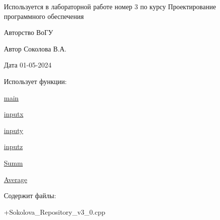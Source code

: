 Используется в лабораторной работе номер 3 по курсу Проектирование программного обеспечения \begin{DoxyCopyright}{Авторство}
ВоГУ 
\end{DoxyCopyright}
\begin{DoxyAuthor}{Автор}
Соколова В.\+А. 
\end{DoxyAuthor}
\begin{DoxyDate}{Дата}
01-\/05-\/2024 
\end{DoxyDate}
\begin{DoxyParagraph}{Использует функции\+:}

\begin{DoxyItemize}
\item \hyperlink{_09_sokolova___repository__v3__0_8cpp_ae66f6b31b5ad750f1fe042a706a4e3d4}{main}
\item \hyperlink{_09_sokolova___repository__v3__0_8cpp_a195f6f3e6b03b10af67ec037c7298bdf}{inputx}
\item \hyperlink{_09_sokolova___repository__v3__0_8cpp_ac982aca0c71e2c366d8787fc041565ba}{inputy}
\item \hyperlink{_09_sokolova___repository__v3__0_8cpp_a1ce441a556fcc55ccbdc2228a4d5b5b2}{inputz}
\item \hyperlink{_09_sokolova___repository__v3__0_8cpp_aa510738112548871191ec7036cf22b8d}{Summ}
\item \hyperlink{_09_sokolova___repository__v3__0_8cpp_abf30df47b9c9032b92504fef80c6a71e}{Average} 
\end{DoxyItemize}
\end{DoxyParagraph}
\begin{DoxyParagraph}{Содержит файлы\+:}

\begin{DoxyItemize}
\item +\+Sokolova\+\_\+\+Repository\+\_\+v3\+\_\+0.cpp 
\end{DoxyItemize}
\end{DoxyParagraph}
